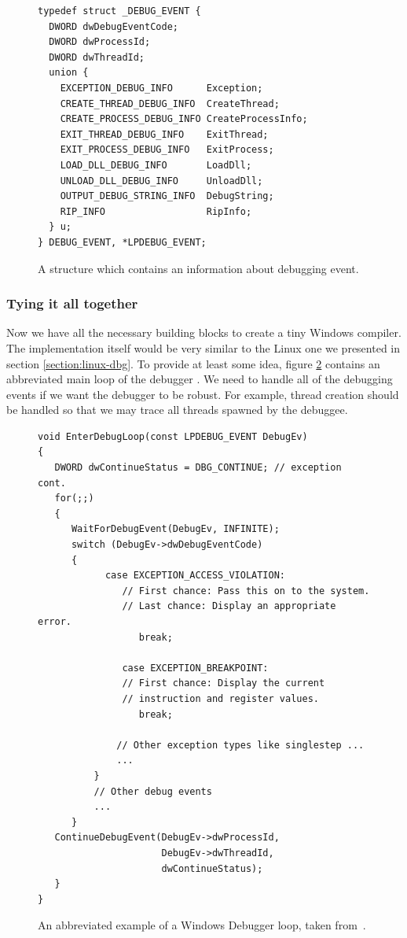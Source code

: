 \begin{figure}
\begin{verbatim}
typedef struct _DEBUG_EVENT {
  DWORD dwDebugEventCode;
  DWORD dwProcessId;
  DWORD dwThreadId;
  union {
    EXCEPTION_DEBUG_INFO      Exception;
    CREATE_THREAD_DEBUG_INFO  CreateThread;
    CREATE_PROCESS_DEBUG_INFO CreateProcessInfo;
    EXIT_THREAD_DEBUG_INFO    ExitThread;
    EXIT_PROCESS_DEBUG_INFO   ExitProcess;
    LOAD_DLL_DEBUG_INFO       LoadDll;
    UNLOAD_DLL_DEBUG_INFO     UnloadDll;
    OUTPUT_DEBUG_STRING_INFO  DebugString;
    RIP_INFO                  RipInfo;
  } u;
} DEBUG_EVENT, *LPDEBUG_EVENT;
\end{verbatim}
\caption{A structure which contains an information about debugging event.}
\label{fig:DebugEvent}
\end{figure}

\subsubsection*{Tying it all together}
Now we have all the necessary building blocks to create a tiny Windows
compiler. The implementation itself would be very similar to the Linux one we
presented in section \ref{section:linux-dbg}. To provide at least some idea,
figure \ref{fig:windows-debugger-mainloop} contains an abbreviated main loop of
the debugger \cite{windows-msdn-dbg-main-loop}. We need to handle all of the
debugging events if we want the debugger to be robust. For example, thread
creation should be handled so that we may trace all threads spawned by the
debuggee.

\begin{figure}
    \begin{verbatim}
void EnterDebugLoop(const LPDEBUG_EVENT DebugEv)
{
   DWORD dwContinueStatus = DBG_CONTINUE; // exception cont.
   for(;;)
   {
      WaitForDebugEvent(DebugEv, INFINITE);
      switch (DebugEv->dwDebugEventCode)
      {
            case EXCEPTION_ACCESS_VIOLATION: 
               // First chance: Pass this on to the system.
               // Last chance: Display an appropriate error.
                  break;

               case EXCEPTION_BREAKPOINT:
               // First chance: Display the current
               // instruction and register values.
                  break;

              // Other exception types like singlestep ...
              ...
          }
          // Other debug events
          ...
      }
   ContinueDebugEvent(DebugEv->dwProcessId,
                      DebugEv->dwThreadId,
                      dwContinueStatus);
   }
}
    \end{verbatim}
    \caption{An abbreviated example of a Windows Debugger loop, taken
    from~\cite{windows-msdn-dbg-main-loop}.}
    \label{fig:windows-debugger-mainloop}
\end{figure}

